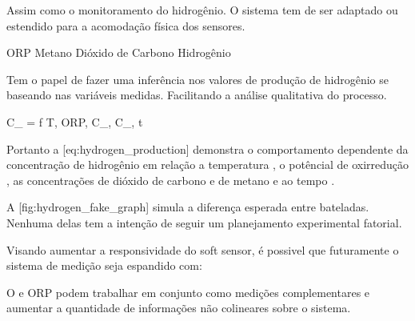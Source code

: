 	Assim como o monitoramento do hidrogênio. O sistema tem de ser adaptado ou estendido para a acomodação física dos sensores.
\stopchapter

\startchapter[title={Sensores}]
	\startplacefigure[title={Sensores físicos disponíveis}]
			{}{ORP}
			{}{Metano}
			{}{Dióxido de Carbono}
			{}{Hidrogênio}
		\stopcombination
	\stopplacefigure
\stopchapter

\startchapter[title={Soft Sensors na Fermentação de Hidrogênio}]
	Tem o papel de fazer uma inferência nos valores de produção de hidrogênio se baseando nas variáveis medidas. Facilitando a análise qualitativa do processo.

	\startplaceformula[reference={eq:hydrogen_production}]
		\startformula
			C_{} = f \left\lparen T, \unit{ORP}, C_{}, C_{}, t \right\rparen
		\stopformula
	\stopplaceformula

	Portanto a [eq:hydrogen_production] demonstra o comportamento dependente da concentração de hidrogênio  em relação a temperatura , o potêncial de oxirredução , as concentrações de dióxido de carbono  e de metano  e ao tempo .

	\startplacefigure[title={Exemplo de coleta de dados de produção de hidrogênio}, reference={fig:hydrogen_fake_graph}]
			{}{}
			{}{}
		\stopcombination
	\stopplacefigure

	A [fig:hydrogen_fake_graph] simula a diferença esperada entre bateladas. Nenhuma delas tem a intenção de seguir um planejamento experimental fatorial.
\stopchapter

\startchapter[title={Possíveis Adições}]
	Visando aumentar a responsividade do soft sensor, é possivel que futuramente o sistema de medição seja espandido com:

	\startitemize
			O  e ORP podem trabalhar em conjunto como medições complementares e aumentar a quantidade de informações não colineares sobre o sistema.
		\stophead

